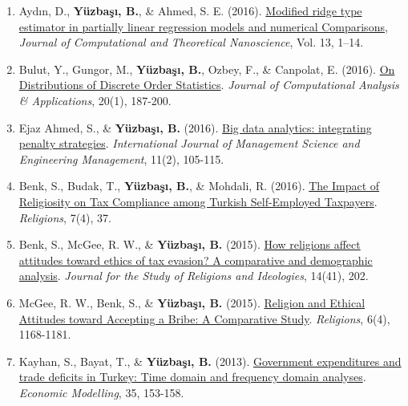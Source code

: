 \documentclass[10pt,a4paper]{article}
\newenvironment{etaremune}{\begin{enumerate}}{\end{enumerate}}
\newcommand{\JournalInfo}[2]{\hspace{0.3em}{\small\textsf{[#1; #2]}}}
\begin{document}
\begin{etaremune}
\item Ayd\i n, D., {\bf Y\"{u}zba\c{s}{\i}, B.}, \& Ahmed, S. E. (2016). 
\href{http://www.ingentaconnect.com/contentone/asp/jctn/2016/00000013/00000010/art00087?crawler=true&mimetype=application/pdf}{Modified ridge type estimator in partially linear regression models and numerical Comparisons}, 
\emph{Journal of Computational and Theoretical Nanoscience}, Vol. 13, 1--14. 




\item Bulut, Y., Gungor, M., {\bf Y\"{u}zba\c{s}{\i}, B.}, Ozbey, F., \& Canpolat, E. (2016). 
\href{http://www.eudoxuspress.com/images/VOLUME-20-JOCAAA-2016-ISSUE-1.pdf}
{On Distributions of Discrete Order Statistics}. 
\emph{Journal of Computational Analysis \& Applications}, 20(1), 187-200. \JournalInfo{SCIE}{Q4}

\item Ejaz Ahmed, S., \& {\bf Y\"{u}zba\c{s}{\i}, B.} (2016). 
\href{http://www.tandfonline.com/doi/abs/10.1080/17509653.2016.1153252}{Big data analytics: integrating penalty strategies}. 
\emph{International Journal of Management Science and Engineering Management}, 11(2), 105-115.



\item Benk, S., Budak, T., {\bf Y\"{u}zba\c{s}{\i}, B.}, \& Mohdali, R. (2016). 
\href{http://www.mdpi.com/2077-1444/7/4/37}{The Impact of Religiosity on Tax Compliance among Turkish Self-Employed Taxpayers}. 
\emph{Religions}, 7(4), 37. \JournalInfo{AHCI}{Q1}
 \label{by2016b}
 


\item Benk, S., McGee, R. W., \& {\bf Y\"{u}zba\c{s}{\i}, B.} (2015). 
\href{http://jsri.ro/ojs/index.php/jsri/article/view/777}
{How religions affect attitudes toward ethics of tax evasion? A comparative and demographic analysis}. 
\emph{Journal for the Study of Religions and Ideologies}, 14(41), 202. \JournalInfo{AHCI}{Q1}
 \label{by2015a}
	
\item McGee, R. W., Benk, S., \& {\bf Y\"{u}zba\c{s}{\i}, B.} (2015). 
\href{http://www.mdpi.com/2077-1444/6/4/1168}{Religion and Ethical Attitudes toward Accepting a Bribe: A Comparative Study}. 
\emph{Religions}, 6(4), 1168-1181. \JournalInfo{AHCI}{Q1}
\label{by2015b}

\item Kayhan, S., Bayat, T., \& {\bf Y\"{u}zba\c{s}{\i}, B.} (2013). 
\href{http://www.sciencedirect.com/science/article/pii/S026499931300240X}
{Government expenditures and trade deficits in Turkey: Time domain and frequency domain analyses}. 
\emph{Economic Modelling}, 35, 153-158. \JournalInfo{SSCI}{Q1}


\end{etaremune}
\end{document}
